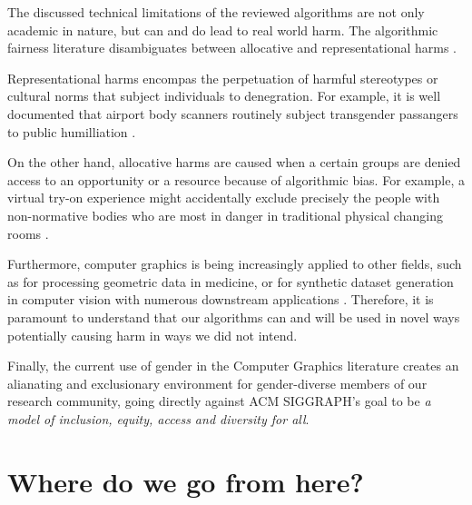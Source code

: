 \documentclass[nonacm,sigconf,review,balance=false]{acmart}
\begin{document}
The discussed technical limitations of the reviewed algorithms are not only academic in nature, but can and do lead to real world harm. The algorithmic fairness literature disambiguates between allocative and representational harms .

Representational harms encompas the perpetuation of harmful stereotypes or cultural norms that subject individuals to denegration. For example, it is well documented that airport body scanners routinely subject transgender passangers to public humilliation \cite{tsa}.

On the other hand, allocative harms are caused when a certain groups are denied access to an opportunity or a resource because of algorithmic bias. For example, a virtual try-on experience  might accidentally exclude precisely the people with non-normative bodies who are most in danger in traditional physical changing rooms \cite{changingroom}.

Furthermore, computer graphics is being increasingly applied to other fields, such as for processing geometric data in medicine, or for synthetic dataset generation in computer vision with numerous downstream applications \cite{cars, chen2021synthetic, dhs}. Therefore, it is paramount to understand that our algorithms can and will be used in novel ways potentially causing harm in ways we did not intend.

Finally, the current use of gender in the Computer Graphics literature creates an alianating and exclusionary environment for gender-diverse members of our research community, going directly against ACM SIGGRAPH's goal to be \emph{a model of inclusion, equity, access and diversity for all}.

\section{Where do we go from here?}

\end{document}
